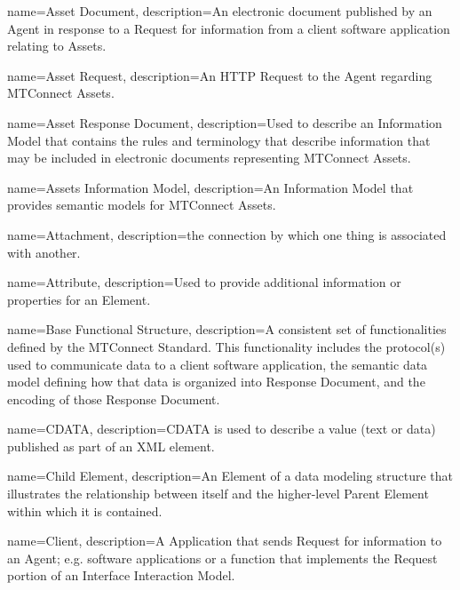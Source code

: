 {
    name={Asset Document},
	description={An electronic document published by an \gls{Agent} in response to a \gls{Request} for information from a client software application relating to Assets.
}
}

{
    name={Asset Request},
	description={An \gls{HTTP Request} to the \gls{Agent} regarding \glspl{MTConnect Asset}.}
}

{
    name={Asset Response Document},
	description={Used to describe an \gls{Information Model} that contains the rules and terminology that describe information that may be included in electronic documents representing \glspl{MTConnect Asset}.}
}

{
    name={Assets Information Model},
	description={An {{Information Model}} that provides semantic models for \glspl{MTConnect Asset}.}
}

{
    name={Attachment},
	description={the connection by which one thing is associated with another.}
}

{
    name={Attribute},
	description={Used to provide additional information or properties for an \gls{Element}.
}
}

{
    name={Base Functional Structure},
	description={A consistent set of functionalities defined by the MTConnect Standard. This functionality includes the protocol(s) used to communicate data to a client software application, the \gls{semantic data model} defining how that data is organized into \gls{Response Document}, and the encoding of those \gls{Response Document}.
}
}

{
    name={CDATA},
	description={\gls{CDATA} is used to describe a value (text or data) published as part of an XML element.}
}

{
    name={Child Element},
	description={An \gls{Element} of a data modeling structure that illustrates the relationship between itself and the higher-level \gls{Parent Element} within which it is contained.}
}

{
    name={Client},
	description={A \gls{Application} that sends \gls{Request} for information to an \gls{Agent}; e.g. software applications or a function that implements the \gls{Request} portion of an \gls{Interface} \gls{Interaction Model}.
}
}

